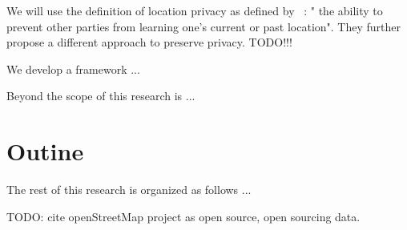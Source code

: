 We will use the definition of location privacy as defined by ~\parencite{location-privacy}: " the ability to prevent other parties from learning
one’s current or past location". They further propose a different approach to preserve privacy. TODO!!!

We develop a framework ... 

Beyond the scope of this research is ...

\section{Outine}

The rest of this research is organized as follows ...

TODO: cite openStreetMap project as open source, open sourcing data.